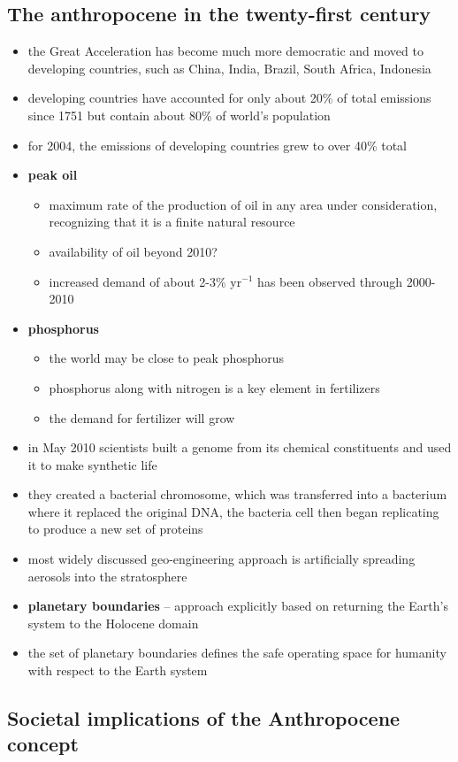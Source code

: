 \subsection{The anthropocene in the twenty-first century}
\begin{itemize}
	\item the Great Acceleration has become much more democratic and moved
	to developing countries, such as China, India, Brazil, South Africa,
	Indonesia
	\item developing countries have accounted for only about 20\% of total
	emissions since 1751 but contain about 80\% of world's population
	\item for 2004,  the emissions of developing countries grew to over
	40\% total
	\item \textbf{peak oil}
	\begin{itemize}
		\item maximum rate of the production of oil in any area under
		consideration, recognizing that it is a finite natural resource
		\item availability of oil beyond 2010?
		\item increased demand of about 2-3\% yr$^{-1}$ has been
		observed through 2000-2010
	\end{itemize}
	\item \textbf{phosphorus}
	\begin{itemize}
		\item the world may be close to peak phosphorus
		\item phosphorus along with nitrogen is a key element in
		fertilizers
		\item the demand for fertilizer will grow
	\end{itemize}
	\item in May 2010 scientists built a genome from its chemical
	constituents and used it to make synthetic life
	\item they created a bacterial chromosome, which was transferred into
	a bacterium where it replaced the original DNA, the bacteria cell then
	began replicating to produce a new set of proteins
	\item most widely discussed geo-engineering approach is artificially
	spreading aerosols into the stratosphere
	\item \textbf{planetary boundaries} -- approach explicitly based on
	returning the Earth's system to the Holocene domain
	\item the set of planetary boundaries defines the safe operating space
	for humanity with respect to the Earth system
\end{itemize}

\subsection{Societal implications of the Anthropocene concept}
